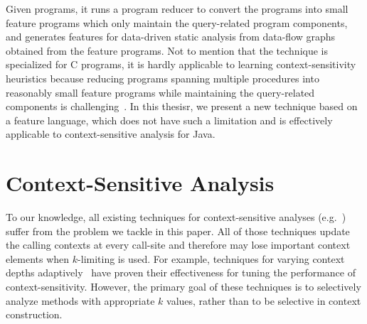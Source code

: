 Given programs, it runs a program reducer to convert the programs into small feature programs which only maintain the query-related program components,
and generates features for data-driven static analysis from data-flow graphs obtained from the feature programs.
Not to mention that the technique is specialized for C programs, it is hardly applicable to learning context-sensitivity heuristics because reducing programs spanning multiple procedures into reasonably small feature programs while maintaining the query-related components is challenging~\cite{ChOhHeYa17}. In this thesisr, we present a new technique based on a feature language, which does not have such a limitation and is effectively applicable to context-sensitive analysis for Java.




\section{Context-Sensitive Analysis} To our knowledge, all
existing techniques for context-sensitive analyses
(e.g.~\cite{Sharir1981,Milanova2002,Shivers1988,
  Whaley2004,Milanova2005,Smaragdakis2011, Khedker2008,
  Karkare2007,kastrinis2013hybrid,WeiR15,Smaragdakis2014,JeJeChOh17,Oh2014,TanLX16,PadhyeK13})
suffer from the problem we tackle in this paper. All of those
techniques update the calling contexts at every call-site and
therefore may lose important context elements when $k$-limiting is used.  For example,
techniques for varying context depths
adaptively~\cite{WeiR15,JeJeChOh17,Oh2014, Smaragdakis2014} have proven
their effectiveness for tuning the performance of context-sensitivity.  However,
the primary goal of these techniques is to selectively analyze methods
with appropriate $k$ values, rather than to be selective in context
construction.


